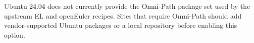 Ubuntu 24.04 does not currently provide the Omni-Path package set used by the
upstream EL and openEuler recipes. Sites that require Omni-Path should add
vendor-supported Ubuntu packages or a local repository before enabling this
option.
